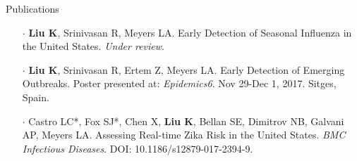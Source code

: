 \documentclass{my_resume} %
\begin{document}

\begin{rSection}{Publications}
  \begin{itemize}
    \setlength\itemsep{-1.6em}
    \setlength\leftskip{-1.2em}
    \item[$\cdot$] {\bf Liu K}, Srinivasan R, Meyers LA. Early Detection of
      Seasonal Influenza in the United States. {\em Under review}.\\
    \item[$\cdot$] {\bf Liu K}, Srinivasan R, Ertem Z, Meyers LA. Early
      Detection of Emerging Outbreaks. Poster presented at: {\em Epidemics6}. Nov
      29-Dec 1, 2017. Sitges, Spain.\\
    \item[$\cdot$] Castro LC*, Fox SJ*, Chen X, {\bf Liu K}, Bellan SE, Dimitrov NB, Galvani AP,
    Meyers LA. Assessing Real-time Zika Risk in the United States. {\em BMC
    Infectious Diseases}. DOI: 10.1186/s12879-017-2394-9.
  \end{itemize}
\end{rSection}

\end{document}
